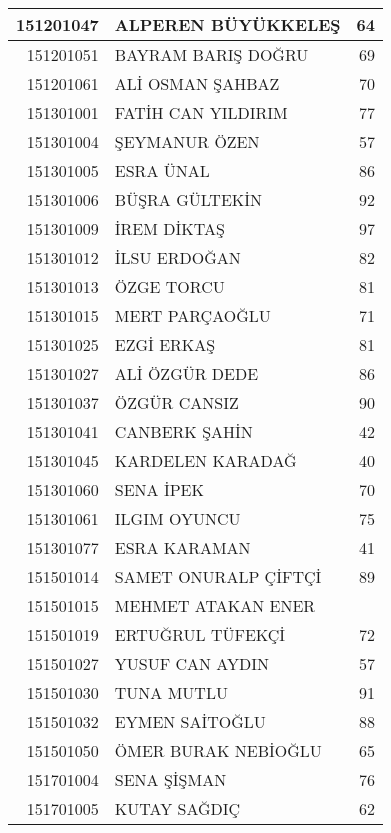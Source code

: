 \documentclass[12pt]{article}
\begin{document}
\begin{multicols}{2}
\begin{longtable}{||r||l||r||}
    \midrule
    151201047 & ALPEREN BÜYÜKKELEŞ & 64 \\
    \midrule
    151201051 & BAYRAM BARIŞ DOĞRU & \cellcolor[rgb]{ 1,  1,  0} 69 \\
    \midrule
    151201061 & ALİ OSMAN ŞAHBAZ & 70 \\
    \midrule
    151301001 & FATİH CAN YILDIRIM & 77 \\
    \midrule
    151301004 & ŞEYMANUR ÖZEN & 57 \\
    \midrule
    151301005 & ESRA ÜNAL & 86 \\
    \midrule
    151301006 & BÜŞRA GÜLTEKİN & 92 \\
    \midrule
    151301009 & İREM DİKTAŞ & 97 \\
    \midrule
    151301012 & İLSU ERDOĞAN & 82 \\
    \midrule
    151301013 & ÖZGE TORCU & 81 \\
    \midrule
    151301015 & MERT PARÇAOĞLU & 71 \\
    \midrule
    151301025 & EZGİ ERKAŞ & 81 \\
    \midrule
    151301027 & ALİ ÖZGÜR DEDE & 86 \\
    \midrule
    151301037 & ÖZGÜR CANSIZ & 90 \\
    \midrule
    151301041 & CANBERK ŞAHİN & 42 \\
    \midrule
    151301045 & KARDELEN KARADAĞ & 40 \\
    \midrule
    151301060 & SENA İPEK & 70 \\
    \midrule
    151301061 & ILGIM OYUNCU & 75 \\
    \midrule
    151301077 & ESRA KARAMAN & 41 \\
    \midrule
    151501014 & SAMET ONURALP ÇİFTÇİ & 89 \\
    \midrule
    151501015 & MEHMET ATAKAN ENER &  \\
    \midrule
    151501019 & ERTUĞRUL TÜFEKÇİ & 72 \\
    \midrule
    151501027 & YUSUF CAN AYDIN & 57 \\
    \midrule
    151501030 & TUNA MUTLU & 91 \\
    \midrule
    151501032 & EYMEN SAİTOĞLU & 88 \\
    \midrule
    151501050 & ÖMER BURAK NEBİOĞLU & 65 \\
    \midrule
    151701004 & SENA ŞİŞMAN & 76 \\
    \midrule
    151701005 & KUTAY SAĞDIÇ & \cellcolor[rgb]{ 1,  1,  0} 62 \\

\end{longtable}
\end{multicols}
\end{document}
